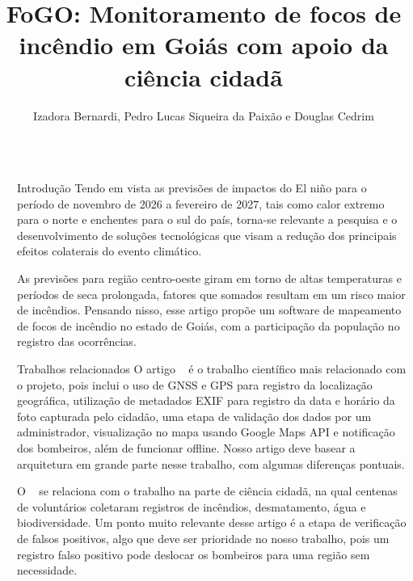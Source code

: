 \documentclass{beamer}
\title{FoGO: Monitoramento de focos de incêndio em Goiás com apoio da ciência cidadã}
\author{Izadora Bernardi, Pedro Lucas Siqueira da Paixão e Douglas Cedrim}
\institute[shortinst]{Bacharelado em ciência da computação, IF Goiano - Campus Rio Verde}
\newlength{\sepwidth}
\newlength{\colwidth}
\newcommand{\separatorcolumn}{\begin{column}{\sepwidth}\end{column}}
\begin{document}

	\begin{frame}[t]
		\begin{columns}[t]
			
			\separatorcolumn			
			\begin{column}{\colwidth}
			
			    \begin{block}{Introdução}
			            Tendo em vista as previsões de impactos do El niño para o período de novembro de 2026 a fevereiro de 2027, tais como calor extremo para o norte e enchentes para o sul do país, torna-se relevante a pesquisa e o desenvolvimento de soluções tecnológicas que visam a redução dos principais efeitos colaterais do evento climático.

						As previsões para região centro-oeste giram em torno de altas temperaturas e períodos de seca prolongada, fatores que somados resultam em um risco maior de incêndios. Pensando nisso, esse artigo propõe um software de mapeamento de focos de incêndio no estado de Goiás, com a participação da população no registro das ocorrências.
			        
			    \end{block}
			
			    \begin{block}{Trabalhos relacionados}
					O artigo ~\cite{teguh2021android} é o trabalho científico mais relacionado com o projeto, pois inclui o uso de GNSS e GPS para registro da localização geográfica, utilização de metadados EXIF para registro da data e horário da foto capturada pelo cidadão, uma etapa de validação dos dados por um administrador, visualização no mapa usando Google Maps API e notificação dos bombeiros, além de funcionar offline. Nosso artigo deve basear a arquitetura em grande parte nesse trabalho, com algumas diferenças pontuais.

					O ~\cite{maillard2024citizen} se relaciona com o trabalho na parte de ciência cidadã, na qual centenas de voluntários coletaram registros de incêndios, desmatamento, água e biodiversidade. Um ponto muito relevante desse artigo é a etapa de verificação de falsos positivos, algo que deve ser prioridade no nosso trabalho, pois um registro falso positivo pode deslocar os bombeiros para uma região sem necessidade.


\end{block}
\end{column}
\end{columns}
\end{frame}
\end{document}
